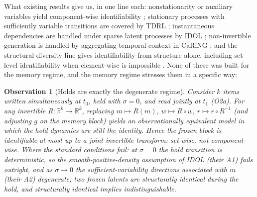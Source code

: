 \documentclass[11pt]{article}
\theoremstyle{plain}
\newtheorem{observation}{Observation}
\theoremstyle{definition}
\begin{document}
What existing results give us, in one line each: nonstationarity or auxiliary variables yield component-wise identifiability \cite{hyvarinen2016, hyvarinen2017, khemakhem2020, yao2021leap}; stationary processes with sufficiently variable transitions are covered by TDRL \cite{yao2022tdrl}; instantaneous dependencies are handled under sparse latent processes by IDOL \cite{li2025idol}; non-invertible generation is handled by aggregating temporal context in CaRiNG \cite{chen2024caring}; and the structural-diversity line gives identifiability from structure alone, including set-level identifiability when element-wise is impossible \cite{zheng2022, zheng2023, zheng2025concepts, zhang2024multidist}. None of these was built for the memory regime, and the memory regime stresses them in a specific way:

\begin{observation}[Holds are exactly the degenerate regime]\label{obs:frozen}
Consider $k$ items written simultaneously at $t_0$, held with $\sigma = 0$, and read jointly at $t_1$ (O2a). For \emph{any} invertible $R : \mathbb{R}^k \to \mathbb{R}^k$, replacing $m \mapsto R(m)$, $w \mapsto R \circ w$, $r \mapsto r \circ R^{-1}$ (and adjusting $g$ on the memory block) yields an observationally equivalent model in which the hold dynamics are still the identity. Hence the frozen block is identifiable at most up to a joint invertible transform: set-wise, not component-wise. Where the standard conditions fail: at $\sigma = 0$ the hold transition is deterministic, so the smooth-positive-density assumption of IDOL (their A1) fails outright, and as $\sigma \to 0$ the sufficient-variability directions associated with $m$ (their A2) degenerate; two frozen latents are structurally identical during the hold, and structurally identical implies indistinguishable.
\end{observation}
\end{document}
